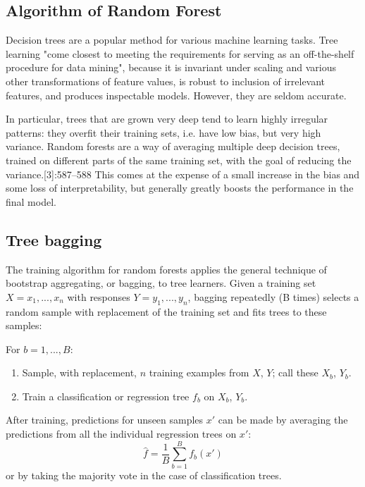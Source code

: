 \documentclass[document.tex]{subfiles}
\begin{document}
\begin{appendices}
        \section{Algorithm of Random Forest}
        Decision trees are a popular method for various machine learning tasks. Tree learning "come closest to meeting the requirements for serving as an off-the-shelf procedure for data mining", because it is invariant under scaling and various other transformations of feature values, is robust to inclusion of irrelevant features, and produces inspectable models. However, they are seldom accurate.
        
        In particular, trees that are grown very deep tend to learn highly irregular patterns: they overfit their training sets, i.e. have low bias, but very high variance. Random forests are a way of averaging multiple deep decision trees, trained on different parts of the same training set, with the goal of reducing the variance.[3]:587–588 This comes at the expense of a small increase in the bias and some loss of interpretability, but generally greatly boosts the performance in the final model.
        
        \subsection{Tree bagging}
        The training algorithm for random forests applies the general technique of bootstrap aggregating, or bagging, to tree learners. Given a training set $X = x_1, ..., x_n$ with responses $Y = y_1, ..., y_n$, bagging repeatedly (B times) selects a random sample with replacement of the training set and fits trees to these samples:
        
        For $b = 1, ..., B:$
        \begin{enumerate}
        	\item Sample, with replacement, $n$ training examples from $X$, $Y$; call these $X_b$, $Y_b$.
        	\item Train a classification or regression tree $f_b$ on $X_b$, $Y_b$.
        \end{enumerate}
        
        After training, predictions for unseen samples $x'$ can be made by averaging the predictions from all the individual regression trees on $x'$:
        \begin{equation}
        	{\displaystyle {\hat {f}}={\frac {1}{B}}\sum _{b=1}^{B}f_{b}(x')} 
        \end{equation}
        or by taking the majority vote in the case of classification trees.
        

\end{appendices}
\end{document}
